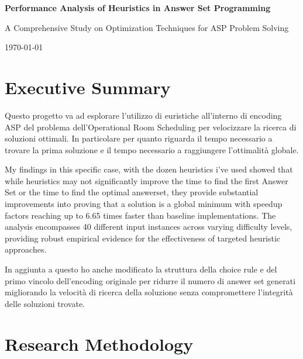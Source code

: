 \documentclass[11pt,a4paper]{article}
\begin{document}
\begin{titlepage}
    \centering
    \vspace*{2cm}
    
    {\Huge\bfseries Performance Analysis of Heuristics in Answer Set Programming}
    
    \vspace{1.5cm}
    
    {\Large A Comprehensive Study on Optimization Techniques for ASP Problem Solving}
    

    \vspace{10.5cm}

    {\large \today}
    
    \vfill
\end{titlepage}

\newpage

\section{Executive Summary}

Questo progetto va ad esplorare l'utilizzo di euristiche all'interno di encoding ASP del problema dell'Operational Room Scheduling per velocizzare la ricerca di soluzioni ottimali. 
In particolare per quanto riguarda il tempo necessario a trovare la prima soluzione e il tempo necessario a raggiungere l'ottimalità globale.

My findings in this specific case, with the dozen heuristics i've used showed that while heuristics may not significantly improve the time to find the first Answer Set or the time to find the optimal answerset, they provide substantial improvements into proving that a solution is a global minimum with speedup factors reaching up to 6.65 times faster than baseline implementations. The analysis encompasses 40 different input instances across varying difficulty levels, providing robust empirical evidence for the effectiveness of targeted heuristic approaches.

In aggiunta a questo ho anche modificato la struttura della choice rule e del primo vincolo dell'encoding originale per ridurre il numero di answer set generati migliorando la velocità di ricerca della soluzione senza compromettere l'integrità delle soluzioni trovate.

\section{Research Methodology}
\end{document}
